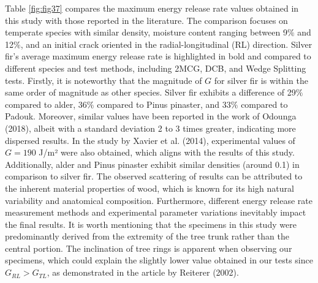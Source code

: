 \documentclass[3p,times,procedia]{elsarticle}
\begin{document}
Table \ref{fig:fig37} compares the maximum energy release rate values obtained in this study with those reported in the literature. The comparison focuses on temperate species with similar density, moisture content ranging between 9$\%$ and 12$\%$, and an initial crack oriented in the radial-longitudinal (RL) direction. Silver fir's average maximum energy release rate is highlighted in bold and compared to different species and test methods, including 2MCG, DCB, and Wedge Splitting tests.
Firstly, it is noteworthy that the magnitude of $G$ for silver fir is within the same order of magnitude as other species. Silver fir exhibits a difference of 29$\%$ compared to alder, 36$\%$ compared to Pinus pinaster, and 33$\%$ compared to Padouk. Moreover, similar values have been reported in the work of Odounga (2018), albeit with a standard deviation 2 to 3 times greater, indicating more dispersed results.
In the study by Xavier et al. (2014), experimental values of $G=190$ J/m² were also obtained, which aligns with the results of this study. Additionally, alder and Pinus pinaster exhibit similar densities (around 0.1) in comparison to silver fir.
The observed scattering of results can be attributed to the inherent material properties of wood, which is known for its high natural variability and anatomical composition. Furthermore, different energy release rate measurement methods and experimental parameter variations inevitably impact the final results.
It is worth mentioning that the specimens in this study were predominantly derived from the extremity of the tree trunk rather than the central portion. The inclination of tree rings is apparent when observing our specimens, which could explain the slightly lower value obtained in our tests since $G_{RL} > G_{TL}$, as demonstrated in the article by Reiterer (2002).
\end{document}
